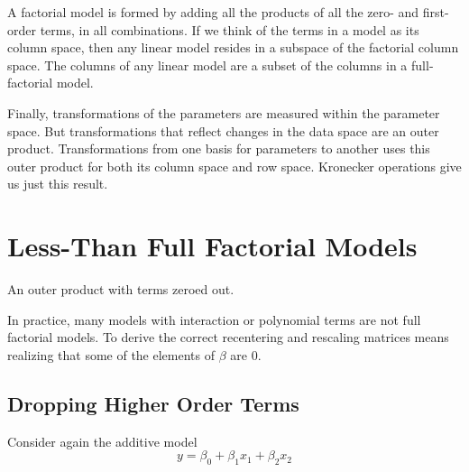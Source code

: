 \documentclass[]{article}
\begin{document}
A factorial model is formed by adding all the products of all the zero-
and first-order terms, in all combinations. If we think of the terms in
a model as its column space, then any linear model resides in a subspace
of the factorial column space. The columns of any linear model are a
subset of the columns in a full-factorial model.

Finally, transformations of the parameters are measured within the
parameter space. But transformations that reflect changes in the data
space are an outer product. Transformations from one basis for
parameters to another uses this outer product for both its column space
and row space. Kronecker operations give us just this result.

\section{Less-Than Full Factorial
Models}\label{less-than-full-factorial-models}

An outer product with terms zeroed out.

In practice, many models with interaction or polynomial terms are not
full factorial models. To derive the correct recentering and rescaling
matrices means realizing that some of the elements of \(\beta\) are
\(0\).

\subsection{Dropping Higher Order
Terms}\label{dropping-higher-order-terms}

Consider again the additive model
\[y = \beta_0 + \beta_1x_1 + \beta_2x_2\]
\end{document}
